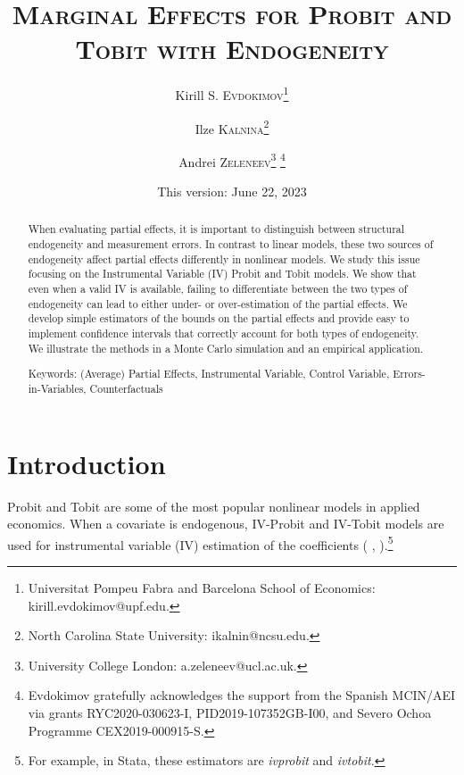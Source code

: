 \documentclass[11pt]{article}
\begin{document}
\title{\textsc{Marginal Effects for Probit and Tobit with Endogeneity}}
\author{Kirill S. \textsc{Evdokimov}\thanks{%
Universitat Pompeu Fabra and Barcelona School of Economics: \textsf{%
kirill.evdokimov@upf.edu}.} \and Ilze \textsc{Kalnina}\thanks{%
North Carolina State University: \textsf{ikalnin@ncsu.edu}.} \and Andrei 
\textsc{Zeleneev}\thanks{%
University College London: \textsf{a.zeleneev@ucl.ac.uk}.} \thanks{
Evdokimov gratefully acknowledges the support from the Spanish MCIN/AEI via
grants RYC2020-030623-I, PID2019-107352GB-I00, and Severo Ochoa Programme
CEX2019-000915-S.}}
\date{This version: June 22, 2023} %
\maketitle

\begin{abstract}

When evaluating partial effects, it is important to distinguish between
structural endogeneity and measurement errors. In contrast to linear models,
these two sources of endogeneity affect partial effects differently in
nonlinear models. We study this issue focusing on the Instrumental Variable
(IV) Probit and Tobit models. We show that even when a valid IV is
available, failing to differentiate between the two types of endogeneity can
lead to either under- or over-estimation of the partial effects. We develop
simple estimators of the bounds on the partial effects and provide easy to
implement confidence intervals that correctly account for both types of
endogeneity. We illustrate the methods in a Monte Carlo simulation and an
empirical application.

\bigskip

Keywords: (Average) Partial Effects, Instrumental Variable, Control
Variable, Errors-in-Variables, Counterfactuals
\end{abstract}

\newpage

\section{Introduction}

Probit and Tobit are some of the most popular nonlinear models in applied
economics. When a covariate is endogenous, IV-Probit and IV-Tobit models are
used for instrumental variable (IV) estimation of the coefficients (%
\citealp{SmithBlundell1986Ecta}, \citealp{RiversVuong1988JoE}).\footnote{%
For example, in Stata, these estimators are \textit{ivprobit} and \textit{%
ivtobit}.}
\end{document}

